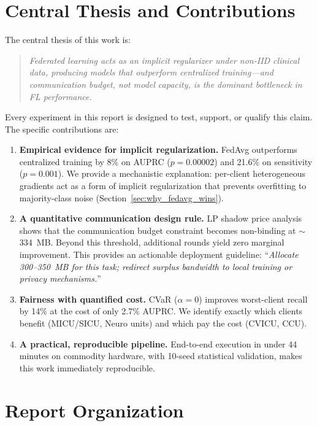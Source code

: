 \documentclass[11pt,a4paper]{report}
\begin{document}
\section{Central Thesis and Contributions}

The central thesis of this work is:

\begin{quote}
\emph{Federated learning acts as an implicit regularizer under non-IID clinical data, producing models that outperform centralized training---and communication budget, not model capacity, is the dominant bottleneck in FL performance.}
\end{quote}

Every experiment in this report is designed to test, support, or qualify this claim. The specific contributions are:

\begin{enumerate}[leftmargin=2em]
\item \textbf{Empirical evidence for implicit regularization.} FedAvg outperforms centralized training by 8\% on AUPRC ($p = 0.00002$) and 21.6\% on sensitivity ($p = 0.001$). We provide a mechanistic explanation: per-client heterogeneous gradients act as a form of implicit regularization that prevents overfitting to majority-class noise (Section~\ref{sec:why_fedavg_wins}).
\item \textbf{A quantitative communication design rule.} LP shadow price analysis shows that the communication budget constraint becomes non-binding at $\sim$334~MB. Beyond this threshold, additional rounds yield zero marginal improvement. This provides an actionable deployment guideline: ``\emph{Allocate 300--350~MB for this task; redirect surplus bandwidth to local training or privacy mechanisms.}''
\item \textbf{Fairness with quantified cost.} CVaR ($\alpha = 0$) improves worst-client recall by 14\% at the cost of only 2.7\% AUPRC. We identify exactly which clients benefit (MICU/SICU, Neuro units) and which pay the cost (CVICU, CCU).
\item \textbf{A practical, reproducible pipeline.} End-to-end execution in under 44 minutes on commodity hardware, with 10-seed statistical validation, makes this work immediately reproducible.
\end{enumerate}

\section{Report Organization}
\end{document}
